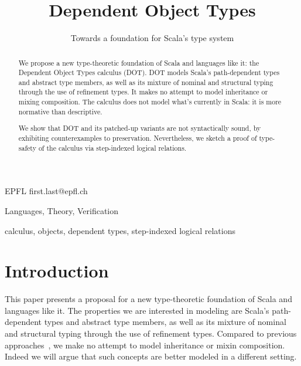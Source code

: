 \documentclass[9pt]{sigplanconf}
\begin{document}
\copyrightdata{[to be supplied]} 

\title{Dependent Object Types}
\subtitle{Towards a foundation for Scala's type system}

           {EPFL}
           {first.last@epfl.ch}

\maketitle

\begin{abstract}
We propose a new type-theoretic foundation of Scala and languages like
it: the Dependent Object Types calculus (DOT). DOT models Scala's
path-dependent types and abstract type members, as well as its mixture
of nominal and structural typing through the use of refinement
types. It makes no attempt to model inheritance or mixing
composition. The calculus does not model what's currently in Scala: it
is more normative than descriptive.

We show that DOT and its patched-up variants are not syntactically
sound, by exhibiting counterexamples to preservation. Nevertheless, we
sketch a proof of type-safety of the calculus via step-indexed logical
relations.
\end{abstract}


\terms
Languages, Theory, Verification

\keywords
calculus, objects, dependent types, step-indexed logical relations

\section{Introduction}

This paper presents a proposal for a new type-theoretic foundation of
Scala and languages like it. The properties we are interested in
modeling are Scala's path-dependent types and abstract type members,
as well as its mixture of nominal and structural typing through the
use of refinement types. Compared to previous approaches~\cite{nuObj,FS},
we make no attempt to model inheritance or mixin composition. Indeed
we will argue that such concepts are better modeled in a different
setting.
\end{document}
